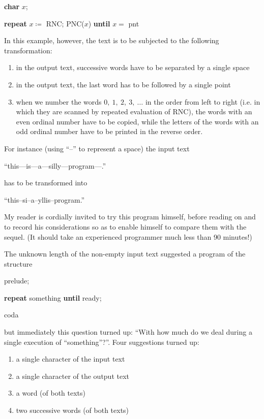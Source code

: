 \quad \textbf{char} $x$;

\quad \textbf{repeat} $x \coloneq$ RNC; PNC($x$) \textbf{until} $x =$ pnt

In this example, however, the text is to be subjected to the following transformation:

\begin{enumerate}[leftmargin=2\parindent, label=(\arabic*)]
	\item in the output text, successive words have to be separated by a single space
	\item in the output text, the last word has to be followed by a single point
	\item when we number the words $0,\ 1,\ 2,\ 3,\ \dots$ in the order from left to right (i.e. in which they are scanned by repeated evaluation of RNC), the words with an even ordinal number have to be copied, while the letters of the words with an odd ordinal number have to be printed in the reverse order.
\end{enumerate}

For instance (using ``--'' to represent a space) the input text

\quad ``this---is---a---silly---program---.''

\noindent
has to be transformed into

\quad ``this--si--a--yllis--program.''

My reader is cordially invited to try this program himself, before reading on and to record his considerations so as to enable himself to compare them with the sequel. (It should take an experienced programmer much less than 90 minutes!)

The unknown length of the non-empty input text suggested a program of the structure

\quad prelude;

\quad \textbf{repeat} something \textbf{until} ready;

\quad coda

\noindent
but immediately this question turned up: ``With how much do we deal during a single execution of ``something''?''. Four suggestions turned up:

\begin{enumerate}[leftmargin=2\parindent, label=(\arabic*)]
	\item a single character of the input text
	\item a single character of the output text
	\item a word (of both texts)
	\item two successive words (of both texts)
\end{enumerate}

